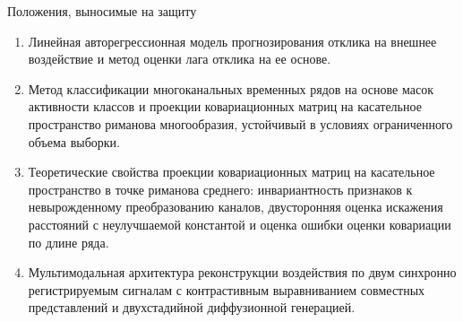 \documentclass[10pt,aspectratio=43]{beamer}
\begin{document}
\begin{frame}{Положения, выносимые на защиту}
\begin{enumerate}
\justifying
    \item Линейная авторегрессионная модель прогнозирования отклика на внешнее воздействие и метод оценки лага отклика на ее основе.
    \item Метод классификации многоканальных временных рядов на основе масок активности классов и проекции ковариационных матриц на касательное пространство риманова многообразия, устойчивый в условиях ограниченного объема выборки.
    \item Теоретические свойства проекции ковариационных матриц на касательное пространство в точке риманова среднего: инвариантность признаков к невырожденному преобразованию каналов, двусторонняя оценка искажения расстояний с неулучшаемой константой и оценка ошибки оценки ковариации по длине ряда.
    \item Мультимодальная архитектура реконструкции воздействия по двум синхронно регистрируемым сигналам с контрастивным выравниванием совместных представлений и двухстадийной диффузионной генерацией.
\end{enumerate}
\end{frame}
\end{document}

